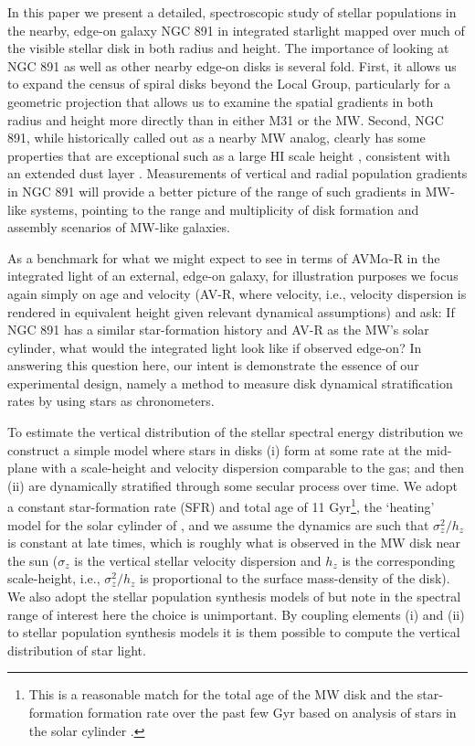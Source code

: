In this paper we present a detailed, spectroscopic study of stellar
populations in the nearby, edge-on galaxy NGC 891 in integrated
starlight mapped over much of the visible stellar disk in both radius
and height. The importance of looking at NGC 891 as well as other
nearby edge-on disks is several fold. First, it allows us to expand
the census of spiral disks beyond the Local Group, particularly for a
geometric projection that allows us to examine the spatial gradients
in both radius and height more directly than in either M31 or the MW.
Second, NGC 891, while historically called out as a nearby MW analog,
clearly has some properties that are exceptional such as a large HI
scale height \citep[$\sim$1 kpc][]{Oosterloo07}, consistent with an
extended dust layer \citep{Howk00}. Measurements of vertical and
radial population gradients in NGC 891 will provide a better picture
of the range of such gradients in MW-like systems, pointing to the
range and multiplicity of disk formation and assembly scenarios of
MW-like galaxies.

As a benchmark for what we might expect to see in terms of
AVM$\alpha$-R in the integrated light of an external, edge-on galaxy,
for illustration purposes we focus again simply on age and velocity
(AV-R, where velocity, i.e., velocity dispersion is rendered in
equivalent height given relevant dynamical assumptions) and ask: If
NGC 891 has a similar star-formation history and AV-R as the MW's
solar cylinder, what would the integrated light look like if observed
edge-on? In answering this question here, our intent is demonstrate
the essence of our experimental design, namely a method to measure
disk dynamical stratification rates by using stars as chronometers.

To estimate the vertical distribution of the stellar spectral energy
distribution we construct a simple model where stars in disks (i) form
at some rate at the mid-plane with a scale-height and velocity
dispersion comparable to the gas; and then (ii) are dynamically
stratified through some secular process over time. We adopt a constant
star-formation rate (SFR) and total age of 11 Gyr\footnote{This is a
  reasonable match for the total age of the MW disk and the
  star-formation formation rate over the past few Gyr based on
  analysis of stars in the solar cylinder
  \citep[e.g.,][]{Pilyugin96a}.}, the `heating' model for the solar
cylinder of \citet{Aumer09}, and we assume the dynamics are such that
$\sigma_z^2/h_z$ is constant at late times, which is roughly what is
observed in the MW disk near the sun ($\sigma_z$ is the vertical
stellar velocity dispersion and $h_z$ is the corresponding
scale-height, i.e., $\sigma_z^2/h_z$ is proportional to the surface
mass-density of the disk). We also adopt the stellar population
synthesis models of \citet{Bruzual03} but note in the spectral range
of interest here the choice is unimportant. By coupling elements (i)
and (ii) to stellar population synthesis models it is them possible to
compute the vertical distribution of star light.

